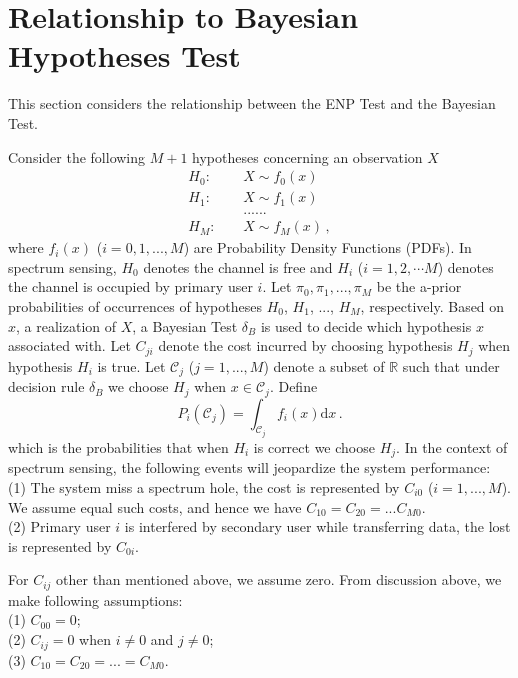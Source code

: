 \section{Relationship to Bayesian Hypotheses Test}
This section considers  the relationship between the ENP Test and the Bayesian Test. 

Consider the following $M+1$ hypotheses concerning an observation $X$
\begin{equation}
\label{equ: 2 pdf}
\begin{split}
H_0:\;\;\;\;&X \sim f_0(x)\\
H_1:\;\;\;\;&X \sim f_1(x)\\
&......\\
H_{M}:\;\;\;\;&X \sim f_M(x)\,,
\end{split}
\end{equation}
where $f_i(x)$ ($i=0, 1, ..., M$) are Probability Density Functions (PDFs). 
In spectrum sensing, $H_0$ denotes the channel is free and $H_i$ ($i = 1, 2, \cdots M$) denotes the channel is occupied by primary user $i$. 
Let $\pi_0, \pi_1, ..., \pi_M$ be the a-prior probabilities of occurrences of hypotheses $H_0$, $H_1$, ..., $H_M$, respectively. 
Based on $x$, a realization of $X$, a Bayesian Test $\delta_B$ is used to decide which hypothesis $x$ associated with.  
Let $C_{ji}$ denote the cost incurred by choosing hypothesis $H_j$ when hypothesis $H_i$ is true. 
Let $\mathcal{C}_j$ ($j=1, ..., M$) denote a subset of $\mathbb{R}$ such that under decision rule $\delta_B$ we choose $H_j$ when $x \in \mathcal{C}_j$. 
Define
\[
P_i(\mathcal{C}_j) = \int_{\mathcal{C}_j} f_i(x)\mathrm{d}x\,.
\]
which is the probabilities that when $H_i$ is correct we choose $H_j$.
In the context of spectrum sensing, the following events will jeopardize the system performance:
\\(1) The system miss a spectrum hole, the cost is represented by $C_{i0}$ ($i = 1, ..., M$). We assume equal such costs, and hence we have $C_{10} = C_{20} = ... C_{M0}$.
\\(2) Primary user $i$ is interfered by secondary user while transferring data, the lost is represented by $C_{0i}$. 

For $C_{ij}$ other than mentioned above, we assume zero. 
From discussion above,  we make following assumptions:
\\(1) $C_{00} = 0$;
\\(2) $C_{ij} = 0$ when $i \neq 0$ and $j \neq 0$;
\\(3) $C_{10} = C_{20} = ... = C_{M0}$.

